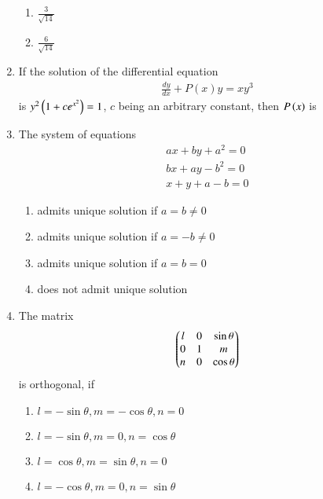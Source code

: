 \documentclass[journal]{IEEEtran}
\begin{document}
\begin{enumerate}
\begin{enumerate}
			\item $\frac{3}{\sqrt{14}}$
	        \item $\frac{6}{\sqrt{14}}$
        	\end{enumerate}
	\item If the solution of the differential equation
          \begin{align*}
              \frac{d y}{d x}+P(x) y=x y^{3}
          \end{align*}
          is $y^{2}\left(1+c e^{x^{2}}\right)=1$,
            $c$ being an arbitrary constant, then $P\left(x\right)$ is
		\begin{enumerate}
        	\end{enumerate}	
	\item The system of equations
            \begin{align*}
a x+b y+a^{2}=0 \\
b x+a y-b^{2}=0 \\
x+y+a-b=0
            \end{align*}
		\begin{enumerate}
			\item admits unique solution if $a=b \neq 0$
			\item admits unique solution if $a=-b \neq 0$
			\item admits unique solution if $a=b=0$
			\item does not admit unique solution
        	\end{enumerate}
	\item The matrix 
          \begin{align*}
              \begin{pmatrix}l&0&\sin \theta \\ 0&1&m\\n&0&\cos \theta\end{pmatrix}
          \end{align*}
          is orthogonal, if
		\begin{enumerate}
              
		       \item $l=-\sin \theta, m=-\cos \theta, n=0$
		       \item $l=-\sin \theta, m=0, n=\cos \theta$
		       \item $l=\cos \theta, m=\sin \theta, n=0$
		       \item $l=-\cos \theta, m=0, n=\sin \theta$
            

\end{enumerate}
\end{enumerate}
\end{document}
